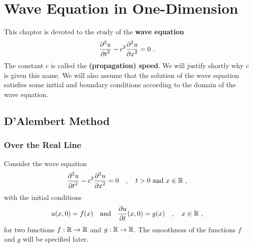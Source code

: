 \chapter{Wave Equation in One-Dimension}\label{ChapWaveEqu1D}

This chapter is devoted to the study of the
{\bfseries wave equation}
\[
\frac{\displaystyle \partial^{2}{u}} {\displaystyle \partial t^{2}} - c^2 \frac{\displaystyle \partial^{2}{u}} {\displaystyle \partial x^{2}} = 0 \ .
\]
The constant $c$ is called the
{\bfseries (propagation) speed}.  We
will justify shortly why $c$ is given this name.
We will also assume that the solution of the wave equation satisfies
some initial and boundary conditions according to the domain of the
wave equation.

\section{D'Alembert Method} \label{wave_sec_oneD}

\subsection{Over the Real Line}

Consider the wave equation
\begin{equation} \label{wave_oneD}
\frac{\displaystyle \partial^{2}{u}} {\displaystyle \partial t^{2}} - c^2 \frac{\displaystyle \partial^{2}{u}} {\displaystyle \partial x^{2}} = 0 \quad , \quad t >0
\text{ and } x \in \mathbb{R} \ ,
\end{equation}
with the initial conditions
\begin{equation} \label{wave_oneD_init}
u(x,0)= f(x) \quad \text{and} \quad \frac{\partial{u}}{\partial t}(x,0) = g(x) \quad ,
\quad x \in \mathbb{R} \ ,
\end{equation}
for two functions $f:\mathbb{R}\rightarrow \mathbb{R}$ and $g:\mathbb{R} \rightarrow \mathbb{R}$.
The smoothness of the functions $f$ and $g$ will be specified later.

